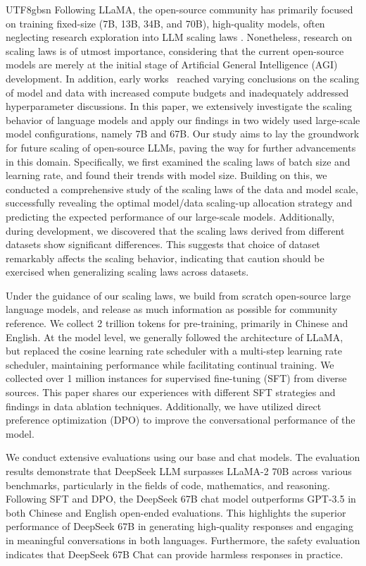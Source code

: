 \documentclass[11pt, a4paper, logo, copyright, nonumbering]{deepseek}
\begin{document}
\begin{CJK*}{UTF8}{gbsn}
Following LLaMA, the open-source community has primarily focused on training fixed-size (7B, 13B, 34B, and 70B), high-quality models, often neglecting research exploration into LLM scaling laws \citep{scalinglaw,chinchilla}. Nonetheless, research on scaling laws is of utmost importance, considering that the current open-source models are merely at the initial stage of Artificial General Intelligence (AGI) development. In addition, early works~\citep{scalinglaw, chinchilla} reached varying conclusions on the scaling of model and data with increased compute budgets and inadequately addressed hyperparameter discussions. 
In this paper, we extensively investigate the scaling behavior of language models and apply our findings in two widely used large-scale model configurations, namely 7B and 67B. Our study aims to lay the groundwork for future scaling of open-source LLMs, paving the way for further advancements in this domain.
Specifically, we first examined the scaling laws of batch size and learning rate, and found their trends with model size. Building on this, we conducted a comprehensive study of the scaling laws of the data and model scale, successfully revealing the optimal model/data scaling-up allocation strategy and predicting the expected performance of our large-scale models. Additionally, during development, we discovered that the scaling laws derived from different datasets show significant differences. 
This suggests that choice of dataset remarkably affects the scaling behavior, indicating that caution should be exercised when generalizing scaling laws across datasets.

Under the guidance of our scaling laws, we build from scratch open-source large language models, and release as much information as possible for community reference. We collect 2 trillion tokens for pre-training, primarily in Chinese and English. At the model level, we generally followed the architecture of LLaMA, but replaced the cosine learning rate scheduler with a multi-step learning rate scheduler, maintaining performance while facilitating continual training.  We collected over  1 million instances for supervised fine-tuning (SFT) \citep{ouyang2022training} from diverse sources.  This paper shares our experiences with different SFT strategies and findings in data ablation techniques. Additionally, we have utilized direct preference optimization (DPO) \citep{dpo} to improve the conversational performance of the model.

We conduct extensive evaluations using our base and chat models. The evaluation results demonstrate that DeepSeek LLM surpasses LLaMA-2 70B across various benchmarks, particularly in the fields of code, mathematics, and reasoning. 
Following SFT and DPO, the DeepSeek 67B chat model outperforms GPT-3.5 in both Chinese and English open-ended evaluations. This highlights the superior performance of DeepSeek 67B in generating high-quality responses and engaging in meaningful conversations in both languages. Furthermore, the safety evaluation indicates that DeepSeek 67B Chat can provide harmless responses in practice. 



\end{CJK*}
\end{document}
